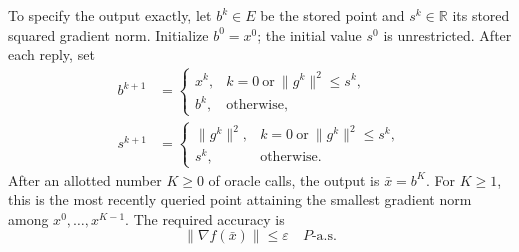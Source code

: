 \documentclass[10pt]{article}
\theoremstyle{definition}
\begin{document}
To specify the output exactly, let $b^k\in E$ be the stored point and $s^k\in\mathbb{R}$ its stored squared gradient norm. Initialize $b^0=x^0$; the initial value $s^0$ is unrestricted. After each reply, set
\[
\begin{aligned}
b^{k+1}&=
\begin{cases}
x^k, & k=0\ \text{or}\ \|g^k\|^2\leq s^k,\\
b^k, & \text{otherwise},
\end{cases}\\
s^{k+1}&=
\begin{cases}
\|g^k\|^2, & k=0\ \text{or}\ \|g^k\|^2\leq s^k,\\
s^k, & \text{otherwise}.
\end{cases}
\end{aligned}
\]
After an allotted number $K\geq0$ of oracle calls, the output is $\bar{x}=b^K$. For $K\geq1$, this is the most recently queried point attaining the smallest gradient norm among $x^0,\ldots,x^{K-1}$. The required accuracy is
\[
\|\nabla f(\bar{x})\|\leq\varepsilon
\quad P\text{-a.s.}
\]
\end{document}
